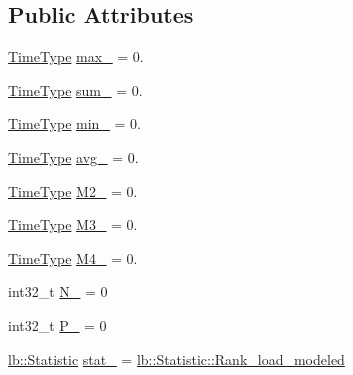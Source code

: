 \subsection*{Public Attributes}
\begin{DoxyCompactItemize}
\item 
\hyperlink{namespacevt_a876a9d0cd5a952859c72de8a46881442}{Time\+Type} \hyperlink{structvt_1_1vrt_1_1collection_1_1balance_1_1_load_data_ab40f4437905013cad01f9cd2dcc2325b}{max\+\_\+} = 0.
\item 
\hyperlink{namespacevt_a876a9d0cd5a952859c72de8a46881442}{Time\+Type} \hyperlink{structvt_1_1vrt_1_1collection_1_1balance_1_1_load_data_ab20f34a82481f573b8db44d7d2f9111c}{sum\+\_\+} = 0.
\item 
\hyperlink{namespacevt_a876a9d0cd5a952859c72de8a46881442}{Time\+Type} \hyperlink{structvt_1_1vrt_1_1collection_1_1balance_1_1_load_data_a2ce7f969bd102daebb5071f5a3da8396}{min\+\_\+} = 0.
\item 
\hyperlink{namespacevt_a876a9d0cd5a952859c72de8a46881442}{Time\+Type} \hyperlink{structvt_1_1vrt_1_1collection_1_1balance_1_1_load_data_a3e0f760e59dfb3d80cedac64d36d2e4f}{avg\+\_\+} = 0.
\item 
\hyperlink{namespacevt_a876a9d0cd5a952859c72de8a46881442}{Time\+Type} \hyperlink{structvt_1_1vrt_1_1collection_1_1balance_1_1_load_data_a04e4244881beaca49025897e5620ed07}{M2\+\_\+} = 0.
\item 
\hyperlink{namespacevt_a876a9d0cd5a952859c72de8a46881442}{Time\+Type} \hyperlink{structvt_1_1vrt_1_1collection_1_1balance_1_1_load_data_a7a23cdc3dda02d87701437321537b79b}{M3\+\_\+} = 0.
\item 
\hyperlink{namespacevt_a876a9d0cd5a952859c72de8a46881442}{Time\+Type} \hyperlink{structvt_1_1vrt_1_1collection_1_1balance_1_1_load_data_a0f702910e47d58e4c5754651ecc592f2}{M4\+\_\+} = 0.
\item 
int32\+\_\+t \hyperlink{structvt_1_1vrt_1_1collection_1_1balance_1_1_load_data_a5e1f990aaaad4bfe9bf9f0a8dc4efecc}{N\+\_\+} = 0
\item 
int32\+\_\+t \hyperlink{structvt_1_1vrt_1_1collection_1_1balance_1_1_load_data_a6f221924e77d7c24d97cd41da5ff274c}{P\+\_\+} = 0
\item 
\hyperlink{namespacevt_1_1vrt_1_1collection_1_1lb_af0e20ef9afee77295053aa83bf1348b1}{lb\+::\+Statistic} \hyperlink{structvt_1_1vrt_1_1collection_1_1balance_1_1_load_data_a59f6d4e2b150a9e5fe32a375b4a6603d}{stat\+\_\+} = \hyperlink{namespacevt_1_1vrt_1_1collection_1_1lb_af0e20ef9afee77295053aa83bf1348b1aa91c95683ba4869756e2b2cb4483fd53}{lb\+::\+Statistic\+::\+Rank\+\_\+load\+\_\+modeled}
\end{DoxyCompactItemize}
